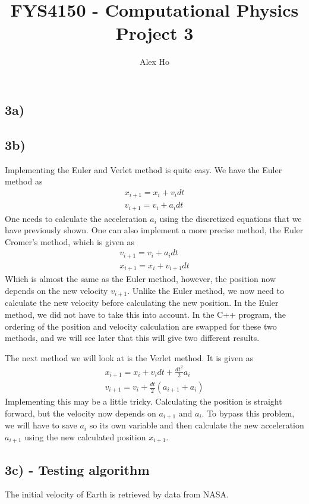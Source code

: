 \documentclass[12pt]{article}
\author{Alex Ho}
\title{FYS4150 - Computational Physics \\ Project 3}
\begin{document}
\maketitle
\subsection*{3a)}
\subsection*{3b)}
Implementing the Euler and Verlet method is quite easy. We have the Euler method as
\begin{align*}
x_{i+1} = x_i + v_idt \\
v_{i+1} = v_i + a_idt
\end{align*}
One needs to calculate the acceleration $a_i$ using the discretized equations that we have previously shown. One can also implement a more precise method, the Euler Cromer's method, which is given as
\begin{align*}
v_{i+1} = v_i + a_idt \\
x_{i+1} = x_i + v_{i+1}dt
\end{align*}
Which is almost the same as the Euler method, however, the position now depends on the new velocity $v_{i+1}$. Unlike the Euler method, we now need to calculate the new velocity before calculating the new position. In the Euler method, we did not have to take this into account. In the C++ program, the ordering of the position and velocity calculation are swapped for these two methods, and we will see later that this will give two different results.

The next method we will look at is the Verlet method. It is given as
\begin{align*}
x_{i+1} = x_i + v_idt + \frac{dt^2}{2}a_i\\
v_{i+1} = v_i + \frac{dt}{2}\left(a_{i+1} + a_i \right)
\end{align*}
Implementing this may be a little tricky. Calculating the position is straight forward, but the velocity now depends on $a_{i+1}$ and $a_i$. To bypass this problem, we will have to save $a_i$ so its own variable and then calculate the new acceleration $a_{i+1}$ using the new calculated position $x_{i+1}$. 

\subsection*{3c) - Testing algorithm}
The initial velocity of Earth is retrieved by data from NASA.
\end{document}
